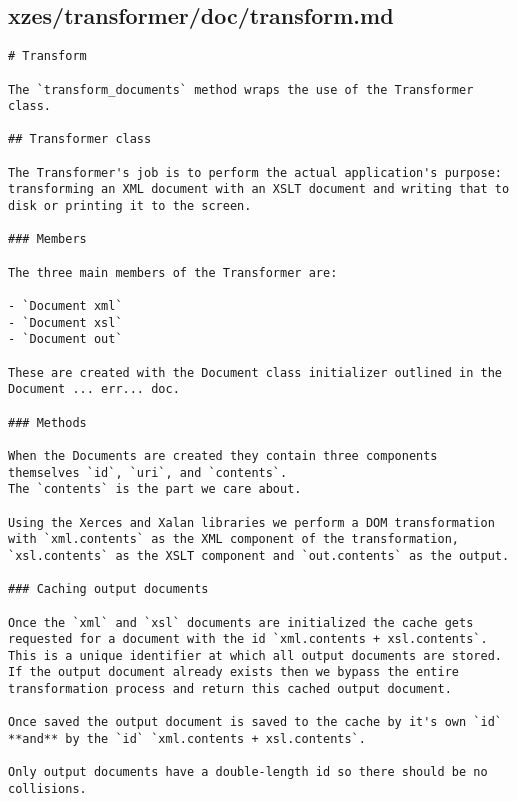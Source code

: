 \subsection{xzes/transformer/doc/transform.md}
\begin{lstlisting}
# Transform

The `transform_documents` method wraps the use of the Transformer class.

## Transformer class

The Transformer's job is to perform the actual application's purpose: transforming an XML document with an XSLT document and writing that to disk or printing it to the screen.

### Members

The three main members of the Transformer are:

- `Document xml`
- `Document xsl`
- `Document out`

These are created with the Document class initializer outlined in the Document ... err... doc.

### Methods

When the Documents are created they contain three components themselves `id`, `uri`, and `contents`.
The `contents` is the part we care about.

Using the Xerces and Xalan libraries we perform a DOM transformation with `xml.contents` as the XML component of the transformation, `xsl.contents` as the XSLT component and `out.contents` as the output.

### Caching output documents

Once the `xml` and `xsl` documents are initialized the cache gets requested for a document with the id `xml.contents + xsl.contents`.
This is a unique identifier at which all output documents are stored.
If the output document already exists then we bypass the entire transformation process and return this cached output document.

Once saved the output document is saved to the cache by it's own `id` **and** by the `id` `xml.contents + xsl.contents`.

Only output documents have a double-length id so there should be no collisions.
\end{lstlisting}

